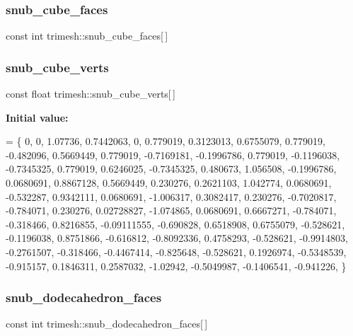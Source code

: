 \subsubsection{\texorpdfstring{snub\+\_\+cube\+\_\+faces}{snub\_cube\_faces}}
{\footnotesize\ttfamily const int trimesh\+::snub\+\_\+cube\+\_\+faces\mbox{[}$\,$\mbox{]}\hspace{0.3cm}{\ttfamily [static]}}

\mbox{\label{namespacetrimesh_ad23260703fa36d0adee643160aaff2af}} 
\subsubsection{\texorpdfstring{snub\+\_\+cube\+\_\+verts}{snub\_cube\_verts}}
{\footnotesize\ttfamily const float trimesh\+::snub\+\_\+cube\+\_\+verts\mbox{[}$\,$\mbox{]}\hspace{0.3cm}{\ttfamily [static]}}

{\bfseries Initial value\+:}
\begin{DoxyCode}
= \{
    0, 0, 1.07736,
    0.7442063, 0, 0.779019,
    0.3123013, 0.6755079, 0.779019,
    -0.482096, 0.5669449, 0.779019,
    -0.7169181, -0.1996786, 0.779019,
    -0.1196038, -0.7345325, 0.779019,
    0.6246025, -0.7345325, 0.480673,
    1.056508, -0.1996786, 0.0680691,
    0.8867128, 0.5669449, 0.230276,
    0.2621103, 1.042774, 0.0680691,
    -0.532287, 0.9342111, 0.0680691,
    -1.006317, 0.3082417, 0.230276,
    -0.7020817, -0.784071, 0.230276,
    0.02728827, -1.074865, 0.0680691,
    0.6667271, -0.784071, -0.318466,
    0.8216855, -0.09111555, -0.690828,
    0.6518908, 0.6755079, -0.528621,
    -0.1196038, 0.8751866, -0.616812,
    -0.8092336, 0.4758293, -0.528621,
    -0.9914803, -0.2761507, -0.318466,
    -0.4467414, -0.825648, -0.528621,
    0.1926974, -0.5348539, -0.915157,
    0.1846311, 0.2587032, -1.02942,
    -0.5049987, -0.1406541, -0.941226,
\}
\end{DoxyCode}
\mbox{\label{namespacetrimesh_a62df14bff286d385532806a7330a55d8}} 
\subsubsection{\texorpdfstring{snub\+\_\+dodecahedron\+\_\+faces}{snub\_dodecahedron\_faces}}
{\footnotesize\ttfamily const int trimesh\+::snub\+\_\+dodecahedron\+\_\+faces\mbox{[}$\,$\mbox{]}\hspace{0.3cm}{\ttfamily [static]}}

